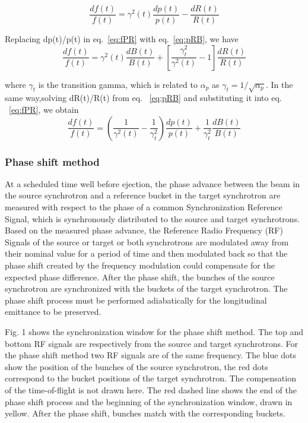 \begin{equation}
\label{eq:fPR}
\frac{df(t)}{f(t)} ={\gamma^2(t)}\frac{dp(t)}{p(t)}-\frac{dR(t)}{R(t)} 
\end{equation}

Replacing dp(t)/p(t) in eq.~\ref{eq:fPR} with eq.~\ref{eq:pRB}, we have
\begin{equation}
\label{eq:fBR}
\frac{df(t)}{f(t)} ={\gamma^2(t)}\frac{dB(t)}{B(t)}+[\frac{\gamma_t^2}{\gamma^2(t)}-1]\frac{dR(t)}{R(t)} 
\end{equation}

where $\gamma_t$ is the transition gamma, which is related to $\alpha_p$ as $\gamma_t=1/\sqrt{\alpha_p}$. In the same way,solving dR(t)/R(t) from eq. ~\ref{eq:pRB} and substituting it into eq. ~\ref{eq:fPR}, we obtain
\begin{equation}
\label{eq:fPB}
\frac{df(t)}{f(t)} =(\frac{1}{\gamma^2(t)}-\frac{1}{\gamma_t^2}) \frac{dp(t)}{p(t)}+\frac{1}{\gamma_t^2}\frac{dB(t)}{B(t)} 
\end{equation}


\subsubsection{Phase shift method}

At a scheduled time well before ejection, the phase advance between the beam in the source synchrotron and a reference bucket in the target synchrotron are measured with respect to the phase of a common Synchronization Reference Signal, which is synchronously distributed to the source and target synchrotrons. Based on the measured phase advance, the  Reference Radio Frequency (RF) Signals of the source or target or both synchrotrons are modulated away from their nominal value for a period of time and then modulated back so that the phase shift created by the frequency modulation could compensate for the expected phase difference. After the phase shift, the bunches of the source synchrotron are synchronized with the buckets of the target synchrotron. The phase shift process must be performed adiabatically for the longitudinal emittance to be preserved.

Fig. 1 shows the synchronization window for the phase shift method. The top and bottom RF signals are respectively from the source and target synchrotrons. For the phase shift method two RF signals are of the same frequency. The blue dots show the position of the bunches of the source synchrotron, the red dots correspond to the bucket positions of the target synchrotron. The compensation of the time-of-flight is not drawn here. The red dashed line shows the end of the phase shift process and the beginning of the synchronization window, drawn in yellow. After the phase shift, bunches match with the corresponding buckets.  

